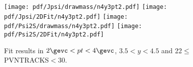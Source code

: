 \begin{figure}[H]
\begin{center}
\texttt{[image: pdf/Jpsi/drawmass/n4y3pt2.pdf]}
\texttt{[image: pdf/Jpsi/2DFit/n4y3pt2.pdf]}
\vspace*{-0.5cm}
\texttt{[image: pdf/Psi2S/drawmass/n4y3pt2.pdf]}
\texttt{[image: pdf/Psi2S/2DFit/n4y3pt2.pdf]}
\vspace*{-0.5cm}
\end{center}
\caption{Fit results in $2\gevc<pt<4\gevc$, $3.5<y<4.5$ and 22$\leq$PVNTRACKS$<$30.}
\label{Fitn4y3pt2}
\end{figure}
